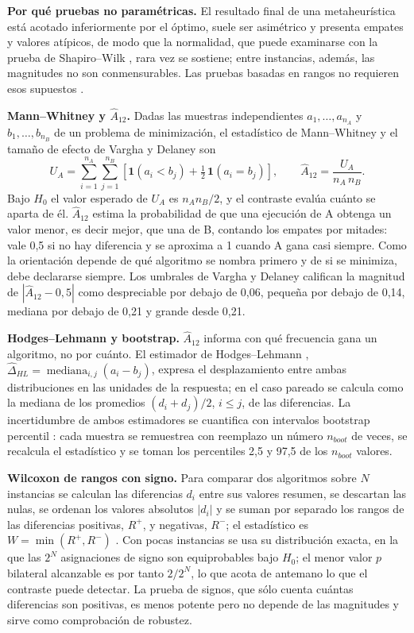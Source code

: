 \textbf{Por qué pruebas no paramétricas.} El resultado final de una metaheurística está acotado inferiormente por el óptimo, suele ser asimétrico y presenta empates y valores atípicos, de modo que la normalidad, que puede examinarse con la prueba de Shapiro--Wilk \cite{Shapiro1965}, rara vez se sostiene; entre instancias, además, las magnitudes no son conmensurables. Las pruebas basadas en rangos no requieren esos supuestos \cite{Derrac2011Tutorial}.

\textbf{Mann--Whitney y $\hat{A}_{12}$.} Dadas las muestras independientes $a_1,\ldots,a_{n_A}$ y $b_1,\ldots,b_{n_B}$ de un problema de minimización, el estadístico de Mann--Whitney \cite{Mann1947} y el tamaño de efecto de Vargha y Delaney \cite{Vargha2000A12} son
\begin{equation}
U_A=\sum_{i=1}^{n_A}\sum_{j=1}^{n_B}\left[\mathbf{1}(a_i<b_j)+\tfrac12\,\mathbf{1}(a_i=b_j)\right],
\qquad
\hat{A}_{12}=\frac{U_A}{n_A\,n_B}.
\label{eq:a12}
\end{equation}
Bajo $H_0$ el valor esperado de $U_A$ es $n_An_B/2$, y el contraste evalúa cuánto se aparta de él. $\hat{A}_{12}$ estima la probabilidad de que una ejecución de A obtenga un valor menor, es decir mejor, que una de B, contando los empates por mitades: vale 0,5 si no hay diferencia y se aproxima a 1 cuando A gana casi siempre. Como la orientación depende de qué algoritmo se nombra primero y de si se minimiza, debe declararse siempre. Los umbrales de Vargha y Delaney califican la magnitud de $|\hat{A}_{12}-0{,}5|$ como despreciable por debajo de 0,06, pequeña por debajo de 0,14, mediana por debajo de 0,21 y grande desde 0,21.

\textbf{Hodges--Lehmann y bootstrap.} $\hat{A}_{12}$ informa con qué frecuencia gana un algoritmo, no por cuánto. El estimador de Hodges--Lehmann \cite{Hodges1963Estimates}, $\hat{\Delta}_{HL}=\operatorname{mediana}_{i,j}(a_i-b_j)$, expresa el desplazamiento entre ambas distribuciones en las unidades de la respuesta; en el caso pareado se calcula como la mediana de los promedios $(d_i+d_j)/2$, $i\leq j$, de las diferencias. La incertidumbre de ambos estimadores se cuantifica con intervalos bootstrap percentil \cite{Efron1994Bootstrap}: cada muestra se remuestrea con reemplazo un número $n_{boot}$ de veces, se recalcula el estadístico y se toman los percentiles 2,5 y 97,5 de los $n_{boot}$ valores.

\textbf{Wilcoxon de rangos con signo.} Para comparar dos algoritmos sobre $N$ instancias se calculan las diferencias $d_i$ entre sus valores resumen, se descartan las nulas, se ordenan los valores absolutos $|d_i|$ y se suman por separado los rangos de las diferencias positivas, $R^+$, y negativas, $R^-$; el estadístico es $W=\min(R^+,R^-)$ \cite{Wilcoxon1945}. Con pocas instancias se usa su distribución exacta, en la que las $2^N$ asignaciones de signo son equiprobables bajo $H_0$; el menor valor $p$ bilateral alcanzable es por tanto $2/2^N$, lo que acota de antemano lo que el contraste puede detectar. La prueba de signos, que sólo cuenta cuántas diferencias son positivas, es menos potente pero no depende de las magnitudes y sirve como comprobación de robustez.

